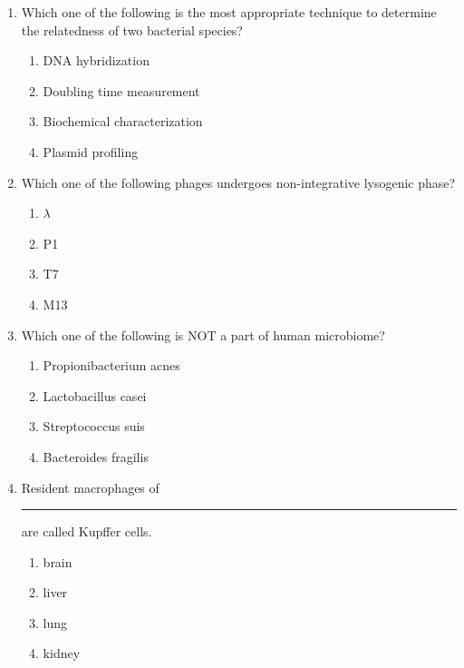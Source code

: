 \documentclass[journal,12pt,onecolumn]{IEEEtran}
\begin{document}
\begin{enumerate}[label=\arabic*.]

\item Which one of the following is the most appropriate technique to determine the relatedness of two bacterial species?

\begin{multicols}{2}
\begin{enumerate}[label=(\Alph*)]
\item DNA hybridization
\item Doubling time measurement
\item Biochemical characterization
\item Plasmid profiling
\end{enumerate}
\end{multicols}

\item Which one of the following phages undergoes non-integrative lysogenic phase?

\begin{multicols}{4}
\begin{enumerate}[label=(\Alph*)]
\item $\lambda$
\item P1
\item T7
\item M13
\end{enumerate}
\end{multicols}

\item Which one of the following is NOT a part of human microbiome?

\begin{multicols}{2}
\begin{enumerate}[label=(\Alph*)]
\item Propionibacterium acnes
\item Lactobacillus casei
\item Streptococcus suis
\item Bacteroides fragilis
\end{enumerate}
\end{multicols}

\item Resident macrophages of\rule{2.5cm}{0.1pt} are called Kupffer cells.

\begin{multicols}{4}
\begin{enumerate}[label=(\Alph*)]
\item brain
\item liver
\item lung
\item kidney
\end{enumerate}
\end{multicols}


\end{enumerate}
\end{document}
